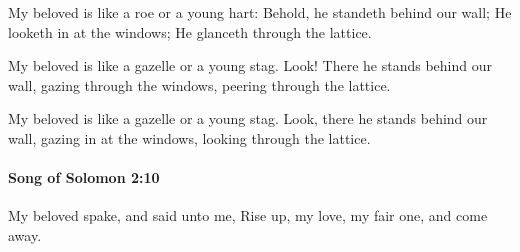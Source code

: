 			\begin{versebox}
					\item[BHS] 
					\item[LXX] 
					\item[ASV] My beloved is like a roe or a young hart: Behold, he standeth behind our wall; He looketh in at the windows; He glanceth through the lattice.
					\item[NIV] My beloved is like a gazelle or a young stag. Look! There he stands behind our wall, gazing through the windows, peering through the lattice.
					\item[NRSV] My beloved is like a gazelle or a young stag. Look, there he stands behind our wall, gazing in at the windows, looking through the lattice.
			\end{versebox}

		\paragraph{Song of Solomon 2:10} %
			\label{SONGOFSOLOMON-2-10}

			My beloved spake, and said unto me, Rise up, my love, my fair one, and come away.

